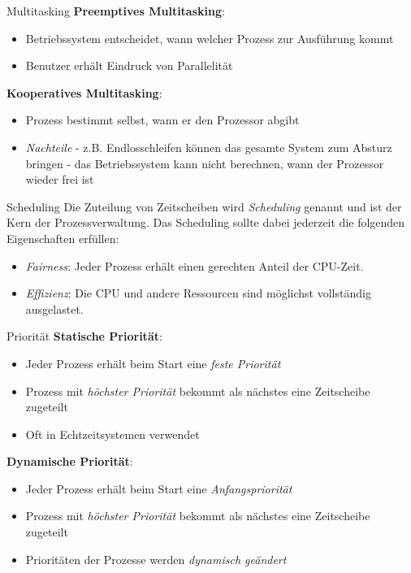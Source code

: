 \documentclass[german]{spicker}
\begin{document}
\begin{bonus}{Multitasking}
    \textbf{Preemptives Multitasking}:
    \begin{itemize}
        \item Betriebssystem entscheidet, wann welcher Prozess zur Ausführung kommt
        \item Benutzer erhält Eindruck von Parallelität
    \end{itemize}

    \textbf{Kooperatives Multitasking}:
    \begin{itemize}
        \item Prozess bestimmt selbst, wann er den Prozessor abgibt
        \item \emph{Nachteile}
              \subitem - z.B. Endlosschleifen können das gesamte System zum Absturz bringen
              \subitem - das Betriebssystem kann nicht berechnen, wann der Prozessor wieder frei ist
    \end{itemize}
\end{bonus}

\begin{defi}{Scheduling}
    Die Zuteilung von Zeitscheiben wird \emph{Scheduling} genannt und ist der Kern der Prozessverwaltung.
    Das Scheduling sollte dabei jederzeit die folgenden Eigenschaften erfüllen:
    \begin{itemize}
        \item \emph{Fairness}: Jeder Prozess erhält einen gerechten Anteil der CPU-Zeit.
        \item \emph{Effizienz}: Die CPU und andere Ressourcen sind möglichst vollständig ausgelastet.
    \end{itemize}
\end{defi}

\begin{bonus}{Priorität}
    \textbf{Statische Priorität}:
    \begin{itemize}
        \item Jeder Prozess erhält beim Start eine \emph{feste Priorität}
        \item Prozess mit \emph{höchster Priorität} bekommt als nächstes eine Zeitscheibe zugeteilt
        \item Oft in Echtzeitsystemen verwendet
    \end{itemize}

    \textbf{Dynamische Priorität}:
    \begin{itemize}
        \item Jeder Prozess erhält beim Start eine \emph{Anfangspriorität}
        \item Prozess mit \emph{höchster Priorität} bekommt als nächstes eine Zeitscheibe zugeteilt
        \item Prioritäten der Prozesse werden \emph{dynamisch geändert}
    \end{itemize}
\end{bonus}
\end{document}
